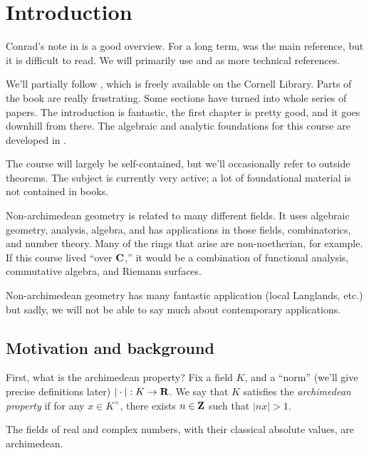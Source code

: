 




\chapter{Introduction}

Conrad's note in \cite{aws-2008} is a good overview. For a long term, 
\cite{bgr-1984} was the main reference, but it is difficult to read. We will 
primarily use \cite{berkovich-1990} and \cite{bosch-2014} as more technical 
references. 

We'll partially follow \cite{berkovich-1990}, which is freely available on 
the Cornell Library. Parts of the book are really frustrating. Some sections 
have turned into whole series of papers. The introduction is fantastic, the 
first chapter is pretty good, and it goes downhill from there. The algebraic 
and analytic foundations for this course are developed in \cite{bgr-1984}. 

The course will largely be self-contained, but we'll occasionally refer to 
outside theorems. The subject is currently very active; a lot of foundational 
material is not contained in books. 

Non-archimedean geometry is related to many different fields. It uses 
algebraic geometry, analysis, algebra, and has applications in those fields, 
combinatorics, and number theory. Many of the rings that arise are 
non-noetherian, for example. If this course lived ``over $\mathbf{C}$,'' it would 
be a combination of functional analysis, commutative algebra, and Riemann 
surfaces. 

Non-archimedean geometry has many fantastic application (local Langlands, etc.) 
but sadly, we will not be able to say much about contemporary applications. 





\section{Motivation and background}

First, what is the archimedean property? Fix a field $K$, and a ``norm'' 
(we'll give precise definitions later) $|\cdot|:K\to \mathbf{R}$. We say that $K$ 
satisfies the \emph{archimedean property} if for any $x\in K^\times$, there 
exists $n\in \mathbf{Z}$ such that $|n x|>1$. 

\begin{example_}
The fields of real and complex numbers, with their classical absolute 
values, are archimedean.
\end{example_}

